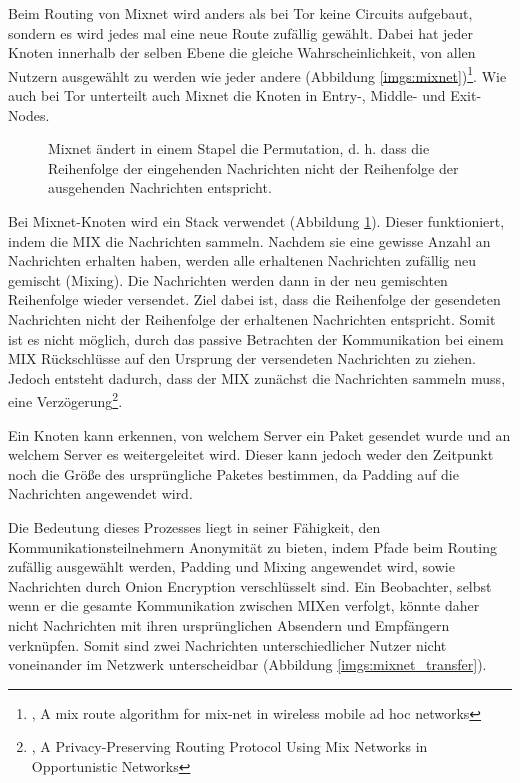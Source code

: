 Beim Routing von Mixnet wird anders als bei Tor keine Circuits aufgebaut, sondern es wird jedes mal eine neue Route zufällig gewählt. Dabei hat jeder Knoten innerhalb der selben Ebene die gleiche Wahrscheinlichkeit, von allen Nutzern ausgewählt zu werden wie jeder andere (Abbildung \ref{imgs:mixnet})\footnote{\cite{MixnetRouteAlgorithm}, A mix route algorithm for mix-net in wireless mobile ad hoc networks}. Wie auch bei Tor unterteilt auch Mixnet die Knoten in Entry-, Middle- und Exit-Nodes.

\begin{figure}[h!]
    \centering
    
    \caption{Mixnet ändert in einem Stapel die Permutation, d. h. dass die Reihenfolge der eingehenden Nachrichten nicht der Reihenfolge der ausgehenden Nachrichten entspricht.}
    \label{imgs:mixnet_stack}
\end{figure}

Bei Mixnet-Knoten wird ein Stack verwendet (Abbildung \ref{imgs:mixnet_stack}). Dieser funktioniert, indem die MIX die Nachrichten sammeln. Nachdem sie eine gewisse Anzahl an Nachrichten erhalten haben, werden alle erhaltenen Nachrichten zufällig neu gemischt (Mixing). Die Nachrichten werden dann in der neu gemischten Reihenfolge wieder versendet. Ziel dabei ist, dass die Reihenfolge der gesendeten Nachrichten nicht der Reihenfolge der erhaltenen Nachrichten entspricht. Somit ist es nicht möglich, durch das passive Betrachten der Kommunikation bei einem MIX Rückschlüsse auf den Ursprung der versendeten Nachrichten zu ziehen. Jedoch entsteht dadurch, dass der MIX zunächst die Nachrichten sammeln muss, eine Verzögerung\footnote{\cite{MixnetStack}, A Privacy-Preserving Routing Protocol Using Mix Networks in Opportunistic Networks}.

Ein Knoten kann erkennen, von welchem Server ein Paket gesendet wurde und an welchem Server es weitergeleitet wird. Dieser kann jedoch weder den Zeitpunkt noch die Größe des ursprüngliche Paketes bestimmen, da Padding auf die Nachrichten angewendet wird.

Die Bedeutung dieses Prozesses liegt in seiner Fähigkeit, den Kommunikationsteilnehmern Anonymität zu bieten, indem Pfade beim Routing zufällig ausgewählt werden, Padding und Mixing angewendet wird, sowie Nachrichten durch Onion Encryption verschlüsselt sind. Ein Beobachter, selbst wenn er die gesamte Kommunikation zwischen MIXen verfolgt, könnte daher nicht Nachrichten mit ihren ursprünglichen Absendern und Empfängern verknüpfen. Somit sind zwei Nachrichten unterschiedlicher Nutzer nicht voneinander im Netzwerk unterscheidbar (Abbildung \ref{imgs:mixnet_transfer}).

